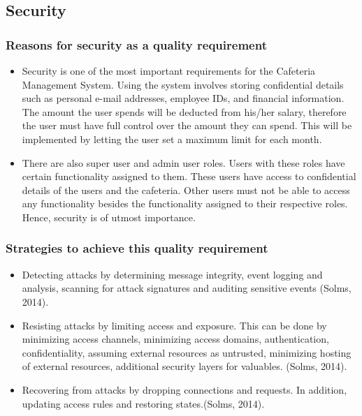 \documentclass[a4paper,12pt]{article}
\begin{document}
\subsection{Security}

\subsubsection{Reasons for security as a quality requirement}
 \begin{itemize}
 \item Security is one of the most important requirements for the Cafeteria Management System. Using the system involves storing confidential details such as personal e-mail addresses, employee IDs, and financial information. The amount the user spends will be deducted from his/her salary, therefore the user must have full control over the amount they can spend. This will be implemented by letting the user set a maximum limit for each month.  
\item There are also super user and admin user roles. Users with these roles have certain functionality assigned to them. These users have access to confidential details of the users and the cafeteria. Other users must not be able to access any functionality besides the functionality assigned to their respective roles. Hence, security is of utmost importance.
 \end{itemize}

 \subsubsection{Strategies to achieve this quality requirement}
 \begin{itemize}
 \item Detecting attacks by determining message integrity, event logging and analysis, scanning for attack signatures and auditing sensitive events (Solms, 2014).
\item Resisting attacks by limiting access and exposure. This can be done by minimizing access channels, minimizing access domains, authentication, confidentiality, assuming external resources as untrusted, minimizing hosting of external resources, additional security layers for valuables. (Solms, 2014).
\item Recovering from attacks by dropping connections and requests. In addition, updating access rules and restoring states.(Solms, 2014).
 \end{itemize}
\end{document}
